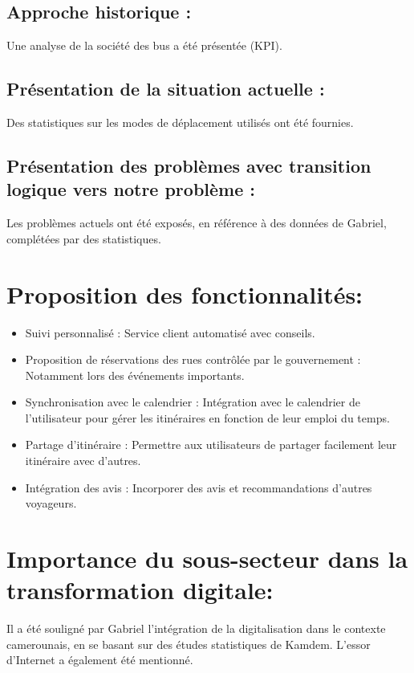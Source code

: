 \documentclass{article}
\begin{document}
\subsection{Approche historique :}
Une analyse de la société des bus a été présentée (KPI).

\subsection{Présentation de la situation actuelle :}
Des statistiques sur les modes de déplacement utilisés ont été fournies.

\subsection{Présentation des problèmes avec transition logique vers notre problème :}
Les problèmes actuels ont été exposés, en référence à des données de Gabriel, complétées par des statistiques.

\section{Proposition des fonctionnalités:}

\begin{itemize}
    \item Suivi personnalisé : Service client automatisé avec conseils.
    \item Proposition de réservations des rues contrôlée par le gouvernement : Notamment lors des événements importants.
    \item Synchronisation avec le calendrier : Intégration avec le calendrier de l'utilisateur pour gérer les itinéraires en fonction de leur emploi du temps.
    \item Partage d'itinéraire : Permettre aux utilisateurs de partager facilement leur itinéraire avec d'autres.
    \item Intégration des avis : Incorporer des avis et recommandations d'autres voyageurs.
\end{itemize}

\section{Importance du sous-secteur dans la transformation digitale:}
Il a été souligné par Gabriel l'intégration de la digitalisation dans le contexte camerounais, en se basant sur des études statistiques de Kamdem. L'essor d'Internet a également été mentionné.
\end{document}
